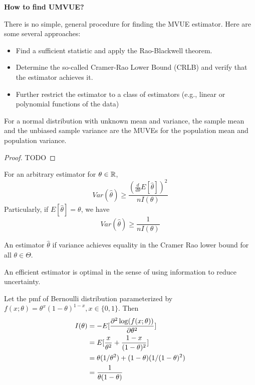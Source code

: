 \begin{refsection}
\begin{theorem}
\end{theorem}



\begin{mdframed}
\textbf{How to find UMVUE?}
	
There is no simple, general procedure for finding the MVUE
estimator. Here are some several
approaches:
\begin{itemize}
	\item Find a sufficient statistic and apply the Rao-Blackwell theorem.
	\item Determine the so-called Cramer-Rao Lower Bound (CRLB)
	and verify that the estimator achieves it.
	\item Further restrict the estimator to a class of estimators (e.g.,
	linear or polynomial functions of the data)
\end{itemize}
\end{mdframed}



\begin{lemma}
For a normal distribution with unknown mean and variance, the sample mean and the unbiased sample variance are the MUVEs for the population mean and population variance.
\end{lemma}
\begin{proof}
TODO

\end{proof}

\begin{theorem}
For an arbitrary estimator for $\theta\in \mathbb{R}$, 
$$Var(\hat{\theta}) \geq \frac{(\frac{d}{d\theta}E[\hat{\theta}])^2}{nI(\theta)}$$
Particularly, if $E[\hat{\theta}] = \theta$, we have
$$Var(\hat{\theta}) \geq \frac{1}{nI(\theta)}$$
\end{theorem}




\begin{definition}
An estimator $\hat{\theta}$ if variance achieves equality in the Cramer Rao lower bound for all $\theta\in \Theta$.
\end{definition}

\begin{remark}
An efficient estimator is optimal in the sense of using information to reduce uncertainty.
\end{remark}

\begin{example}
	Let the pmf of Bernoulli distribution parameterized by $f(x;\theta) = \theta^x(1-\theta)^{1-x},x\in\{0,1\}$. Then
	\begin{align*}
	I(\theta) &= -E[\frac{\partial^2 \log(f(x;\theta))}{\partial \theta^2}] \\
	&= E[\frac{x}{\theta^2} + \frac{1-x}{(1-\theta)^2}]\\
	&= \theta (1/\theta^2) + (1-\theta)(1/(1-\theta)^2) \\
	&= \frac{1}{\theta(1-\theta)}
	\end{align*}
	

\end{example}
\end{refsection}
